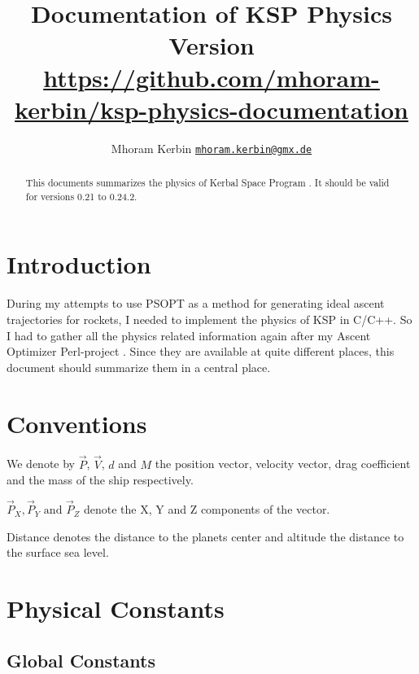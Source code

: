 \documentclass[11pt]{article}
\newcommand{\oa}[1]{\overrightarrow{#1}}
\newcommand{\Pos}{\oa{P}}
\newcommand{\Vel}{\oa{V}}
\begin{document}
\title{Documentation of KSP Physics\\\small{Version }\\\vspace{1 em}\url{https://github.com/mhoram-kerbin/ksp-physics-documentation}}
\author {Mhoram Kerbin \href{mailto:mhoram.kerbin@gmx.de}{\nolinkurl{mhoram.kerbin@gmx.de}}}

\maketitle

\begin{abstract}

  This documents summarizes the physics of Kerbal Space Program
  \cite{KSP}. It should be valid for versions 0.21 to 0.24.2.

\end{abstract}

\tableofcontents

\section{Introduction}

During my attempts to use PSOPT as a method for generating ideal
ascent trajectories for rockets, I needed to implement the physics of
KSP in C/C++. So I had to gather all the physics related information
again after my Ascent Optimizer Perl-project \cite{PAO}. Since they
are available at quite different places, this document should
summarize them in a central place.

\section{Conventions}

We denote by $\Pos$, $\Vel$, $d$ and $M$ the position vector, velocity
vector, drag coefficient and the mass of the ship respectively.

$\Pos_X, \Pos_Y \textrm{ and } \Pos_Z$ denote the X, Y and Z
components of the vector.

Distance denotes the distance to the planets center and altitude the
distance to the surface sea level.

\section{Physical Constants}


\subsection{Global Constants}
\end{document}
